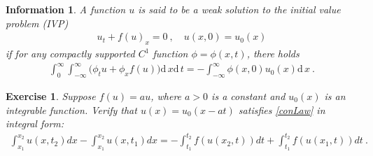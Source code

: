 \documentclass[10pt,letterpaper]{article}
\newcommand{\dif}[1][]{\mathrm{d} {#1}\,}
\theoremstyle{break}
\newtheorem{exercise}{Exercise}
\newtheorem*{information}{Information}
\begin{document}
\begin{information}
	A function $u$ is said to be a \emph{weak solution} to the initial value problem (IVP)
	\begin{gather} \label{conLaw}
		u_t+f(u)_x=0\ ,
		\quad
		u(x,0)=u_0(x)
	\end{gather}%
	if for any compactly supported $C^1$ function $\phi=\phi(x,t)$, there holds
	\begin{gather}%
		\int_0^\infty \int_{-\infty}^\infty \Big( \phi_t u +\phi_x f(u)\Big)\dif x\dif t
		=
		-\int_{-\infty}^\infty \phi(x,0)u_0(x)\dif x\ .
	\end{gather}%
\end{information}



\begin{exercise}
	Suppose $f\!\left(u\right)=au$, where $a>0$ is a constant and $u_{0}\!\left(x\right)$ is an integrable function. Verify that $u(x)=u_{0}(x-at)$ satisfies \eqref{conLaw} in integral form:
	\begin{gather} \label{weakForm}
		\int_{x_{1}}^{x_{2}}u\!\left(x,t_{2}\right) dx
		-
		\int_{x_{1}}^{x_{2}}u\!\left(x,t_{1}\right)dx
		=
		-
		\int_{t_{1}}^{t_{2}}f\!\left(u\!\left(x_{2},t\right)\right)dt
		+
		\int_{t_{1}}^{t_{2}}f\!\left(u\!\left(x_{1},t\right)\right)dt 
		\ .
	\end{gather}%
\end{exercise}
\end{document}
